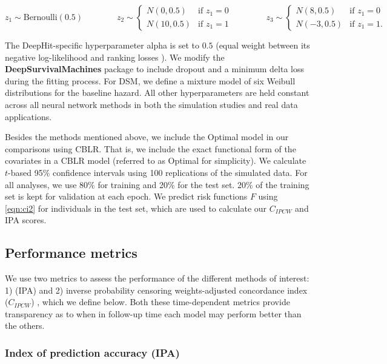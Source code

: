 \documentclass[APA,LATO1COL]{WileyNJD-v2}
\begin{document}
\[
z_{1} \sim \textrm{Bernoulli}(0.5) \qquad \qquad
z_{2} \sim \begin{cases}
 N(0,0.5) & \textrm{if } z_{1}=0\\ 
 N(10,0.5) & \textrm{if } z_{1}=1
\end{cases} \qquad \qquad
z_{3} \sim \begin{cases}
 N(8,0.5) & \textrm{if } z_{1}=0\\ 
 N(-3,0.5) & \textrm{if } z_{1}=1.
\end{cases}
\]

The DeepHit-specific hyperparameter alpha is set to \(0.5\) (equal
weight between its negative log-likelihood and ranking losses
\citep{lee2018DeepHit}). We modify the \textbf{DeepSurvivalMachines}
\citep{dsmPaper} package to include dropout and a minimum delta loss
during the fitting process. For DSM, we define a mixture model of six
Weibull distributions for the baseline hazard. All other hyperparameters
are held constant across all neural network methods in both the
simulation studies and real data applications.

Besides the methods mentioned above, we include the Optimal model in our
comparisons using CBLR. That is, we include the exact functional form of
the covariates in a CBLR model (referred to as Optimal for simplicity).
We calculate \(t\)-based 95\% confidence intervals using 100
replications of the simulated data. For all analyses, we use 80\% for
training and 20\% for the test set. 20\% of the training set is kept for
validation at each epoch. We predict risk functions \(F\) using
\eqref{eqn:ci2} for individuals in the test set, which are used to
calculate our \(C_{IPCW}\) and IPA scores.



\hypertarget{performance-metrics}{%
\subsection{Performance metrics}\label{performance-metrics}}

We use two metrics to assess the performance of the different methods of
interest: 1) (IPA) \citep{kattan2018index} and 2) inverse probability
censoring weights-adjusted concordance index (\(C_{IPCW}\))
\citep{uno2011}, which we define below. Both these time-dependent
metrics provide transparency as to when in follow-up time each model may
perform better than the others.

\hypertarget{index-of-prediction-accuracy-ipa}{%
\subsubsection{Index of prediction accuracy
(IPA)}\label{index-of-prediction-accuracy-ipa}}
\end{document}
